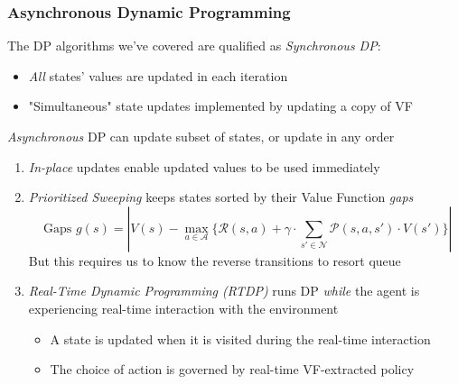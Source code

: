 \documentclass[handout]{beamer}
\begin{document}
\begin{frame}
\frametitle{Asynchronous Dynamic Programming}
\pause
The DP algorithms we've covered are qualified as {\em Synchronous DP}:
\pause
\begin{itemize}
\item {\em All} states' values are updated in each iteration
\item "Simultaneous" state updates implemented by updating a copy of VF
\end{itemize}
\pause
{\em Asynchronous} DP can update subset of states, or update in any order
\pause
\begin{enumerate}[<+->]
\item {\em In-place} updates enable updated values to be used immediately
\item {\em Prioritized Sweeping} keeps states sorted by their Value Function {\em gaps}
$$\text{ Gaps } g(s) = |V(s) - \max_{a\in \mathcal{A}} \{ \mathcal{R}(s,a) + \gamma \cdot \sum_{s' \in \mathcal{N}} \mathcal{P}(s,a,s') \cdot V(s') \}|$$
But this requires us to know the reverse transitions to resort queue
\item {\em Real-Time Dynamic Programming (RTDP)} runs DP {\em while} the agent is experiencing real-time interaction with the environment
\begin{itemize}
\item A state is updated when it is visited during the real-time interaction
\item The choice of action is governed by real-time VF-extracted policy
\end{itemize}
\end{enumerate}
\end{frame}
\end{document}
